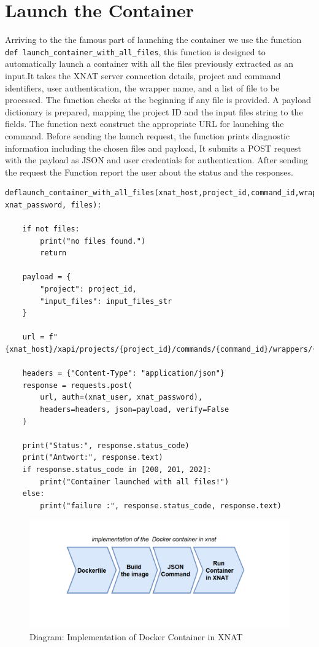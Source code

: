 \section{Launch the Container}
Arriving to the the famous part of launching the container we use the function \texttt{def launch\_container\_with\_all\_files}, this function is designed to automatically launch a container with all the files previously extracted as an input.It takes the XNAT server connection details, project and command identifiers, user authentication, the wrapper name, and a list of file to be processed. The function checks at the beginning if any file is provided. A payload dictionary is prepared, mapping the project ID and the input files string to the fields. The function next construct the appropriate URL for launching the command. Before sending the launch request, the function prints diagnostic information including the chosen files and payload, It submits a POST request with the payload as JSON and user credentials for authentication. After sending the request the Function report the user about the status and the responses.



\begin{lstlisting}
deflaunch_container_with_all_files(xnat_host,project_id,command_id,wrapper_name,xnat_user, xnat_password, files):
   
    if not files:
        print("no files found.")
        return 

    payload = {
        "project": project_id,
        "input_files": input_files_str
    }

    url = f"{xnat_host}/xapi/projects/{project_id}/commands/{command_id}/wrappers/{wrapper_name}/root/project/launch"

    headers = {"Content-Type": "application/json"}
    response = requests.post(
        url, auth=(xnat_user, xnat_password),
        headers=headers, json=payload, verify=False
    )

    print("Status:", response.status_code)
    print("Antwort:", response.text)
    if response.status_code in [200, 201, 202]:
        print("Container launched with all files!")
    else:
        print("failure :", response.status_code, response.text)
\end{lstlisting}

\begin{figure}
    \centering
    \includegraphics[width=0.9\linewidth]{en/content/Screenshot 2025-07-18 122044.png}
    \caption{Diagram: Implementation of Docker Container in XNAT}
    \label{fig:Implementation of Docker Container in XNAT}
\end{figure}





